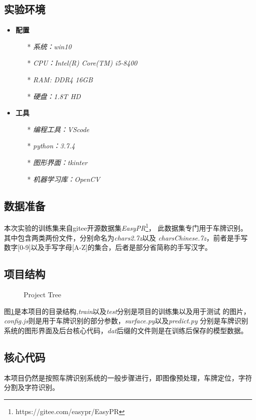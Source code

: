 \documentclass[UTF8,10pt,titlepage,a4paper]{ctexart}
\begin{document}
\subsection{实验环境}
\begin{itemize}
  \item \textbf{配置}
  \begin{itemize}
    \item[*] \emph{系统：win10 }
    \item[*] \emph{CPU：Intel(R) Core(TM) i5-8400}
    \item[*] \emph{RAM: DDR4 16GB}
    \item[*] \emph{硬盘：1.8T HD}
  \end{itemize}
  \item \textbf{工具}
  \begin{itemize}
    \item[*] \emph{编程工具：VScode}
    \item[*] \emph{python：3.7.4}
    \item[*] \emph{图形界面：tkinter}
    \item[*] \emph{机器学习库：OpenCV}
  \end{itemize} 
\end{itemize}
\subsection{数据准备}
本次实验的训练集来自gitee开源数据集\emph{EasyPR}\footnote{https://gitee.com/easypr/EasyPR}，
此数据集专门用于车牌识别。其中包含两类两份文件，分别命名为\emph{chars2.7z}以及
\emph{charsChinese.7z}，前者是手写数字[0-9]以及手写字母[A-Z]的集合，后者是部分省简称的手写汉字。
\subsection{项目结构}
\begin{figure}[h]
\caption{Project Tree}
\label{ref:tree}
\end{figure}
图\ref{ref:tree}是本项目的目录结构,\emph{train}以及\emph{test}分别是项目的训练集以及用于测试
的图片，\emph{config.js}则是用于车牌识别的部分参数，\emph{surface.py}以及\emph{predict.py}
分别是车牌识别系统的图形界面及后台核心代码，\emph{dat}后缀的文件则是在训练后保存的模型数据。
\subsection{核心代码}
本项目仍然是按照车牌识别系统的一般步骤进行，即图像预处理，车牌定位，字符分割及字符识别。
\end{document}
